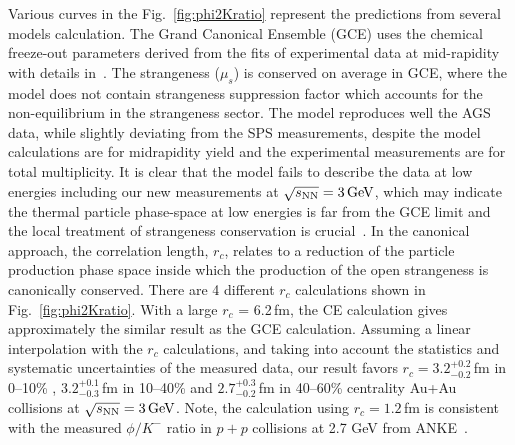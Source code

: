 \documentclass[%
 reprint,	
showpacs,
 amsmath,amssymb,
 aps,
 prc,
]{revtex4-1}
\begin{document}
Various curves in the Fig.~\ref{fig:phi2Kratio} represent the predictions from several models calculation. The Grand Canonical Ensemble (GCE) uses the chemical freeze-out parameters derived from the fits of experimental data at mid-rapidity with details in~\cite{ANDRONIC2006167_SHM}. The strangeness ($\mu_s$) is conserved on average in GCE, where the model does not contain strangeness suppression factor which accounts for the non-equilibrium in the strangeness sector. The model reproduces well the AGS data, while slightly deviating from the SPS measurements, despite the model calculations are for midrapidity yield and the experimental measurements are for total multiplicity. It is clear that the model fails to describe the data at low energies including our new measurements at ${\sqrt{s_{\rm NN}} = \rm{3\,GeV}}$, which may indicate the thermal particle phase-space at low energies is far from the GCE limit and the local treatment of strangeness conservation is crucial~\cite{BraunMunzinger:2003zd,Redlich_CE}. In the canonical approach, the correlation length, $r_c$, relates to a reduction of the particle production phase space inside which the production of the open strangeness is canonically conserved. There are 4 different $r_c$ calculations shown in Fig.~\ref{fig:phi2Kratio}. With a large $r_c$ = 6.2\,fm, the CE calculation gives approximately the similar result as the GCE calculation. Assuming a linear interpolation with the $r_c$ calculations, and taking into account the statistics and systematic uncertainties of the measured data, our result favors $r_c = 3.2_{-0.2}^{+0.2}$\,fm in 0--10\% , $3.2_{-0.3}^{+0.1}$\,fm in 10--40\% and $2.7_{-0.2}^{+0.3}$\,fm in 40--60\% centrality Au+Au collisions at ${\sqrt{s_{\rm NN}} = \rm{3\,GeV}}$. Note, the calculation using $r_c = 1.2$\,fm is consistent with the measured $\phi/K^-$ ratio in $p+p$ collisions at 2.7 GeV from ANKE~\cite{ANKE_phi,HADES_phi_ArKCl}. 
\end{document}
